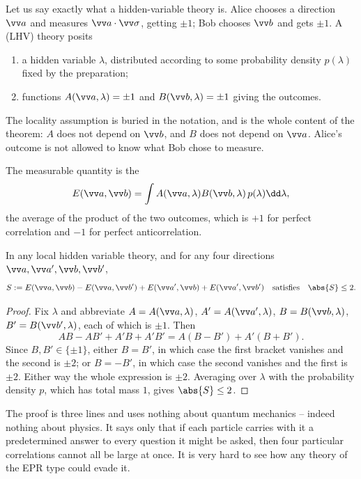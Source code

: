 Let us say exactly what a hidden-variable theory is. Alice chooses a direction $\vv a$ and measures $\vv a \cdot \vv\sigma$, getting $\pm1$; Bob chooses $\vv b$ and gets $\pm1$. A  (LHV) theory posits
\begin{enumerate}[label=(\roman*)]
    \item a hidden variable $\lambda$, distributed according to some probability density $p(\lambda)$ fixed by the preparation;
    \item functions $A(\vv a, \lambda) = \pm 1$ and $B(\vv b, \lambda) = \pm 1$ giving the outcomes.
\end{enumerate}
The locality assumption is buried in the notation, and is the whole content of the theorem: $A$ does not depend on $\vv b$, and $B$ does not depend on $\vv a$. Alice's outcome is not allowed to know what Bob chose to measure.

The measurable quantity is the 
$$
E(\vv a, \vv b) = \int A(\vv a,\lambda)B(\vv b, \lambda)\,p(\lambda)\dd\lambda,
$$
the average of the product of the two outcomes, which is $+1$ for perfect correlation and $-1$ for perfect anticorrelation.

\begin{theorem}
    In any local hidden variable theory, and for any four directions $\vv a, \vv a', \vv b, \vv b'$,
    $$
    S := E(\vv a, \vv b) - E(\vv a, \vv b') + E(\vv a', \vv b) + E(\vv a', \vv b') \quad \text{satisfies} \quad \abs{S} \leq 2.
    $$
\end{theorem}
\begin{proof}
    Fix $\lambda$ and abbreviate $A = A(\vv a,\lambda)$, $A' = A(\vv a',\lambda)$, $B = B(\vv b,\lambda)$, $B' = B(\vv b',\lambda)$, each of which is $\pm1$. Then
    $$
    AB - AB' + A'B + A'B' = A\left( B - B' \right) + A'\left( B + B' \right).
    $$
    Since $B, B' \in \{\pm1\}$, either $B = B'$, in which case the first bracket vanishes and the second is $\pm2$; or $B = -B'$, in which case the second vanishes and the first is $\pm2$. Either way the whole expression is $\pm2$. Averaging over $\lambda$ with the probability density $p$, which has total mass $1$, gives $\abs{S}\leq2$.
\end{proof}

The proof is three lines and uses nothing about quantum mechanics -- indeed nothing about physics. It says only that if each particle carries with it a predetermined answer to every question it might be asked, then four particular correlations cannot all be large at once. It is very hard to see how any theory of the EPR type could evade it.

